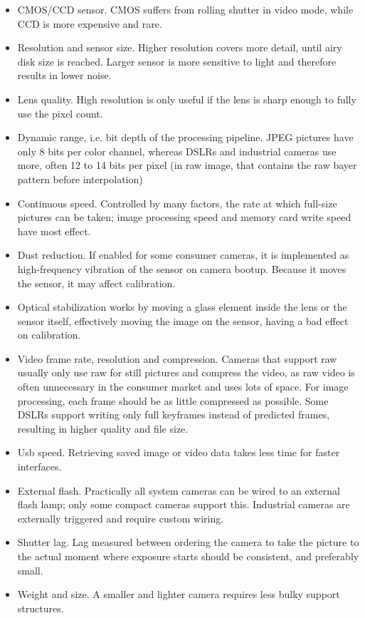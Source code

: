 \begin{itemize}
\item CMOS/CCD sensor. CMOS suffers from rolling shutter in video mode, while CCD is more expensive and rare.
\item Resolution and sensor size. Higher resolution covers more detail, until airy disk size is reached. Larger sensor is more sensitive to light and therefore results in lower noise.
\item Lens quality. High resolution is only useful if the lens is sharp enough to fully use the pixel count.
\item Dynamic range, i.e. bit depth of the processing pipeline. JPEG pictures have only 8 bits per color channel, whereas DSLRs and industrial cameras use more, often 12 to 14 bits per pixel (in raw image, that contains the raw bayer pattern before interpolation)
\item Continuous speed. Controlled by many factors, the rate at which full-size pictures can be taken; image processing speed and memory card write speed have most effect.
\item Dust reduction. If enabled for some consumer cameras, it is implemented as high-frequency vibration of the sensor on camera bootup. Because it moves the sensor, it may affect calibration.
\item Optical stabilization works by moving a glass element inside the lens or the sensor itself, effectively moving the image on the sensor, having a bad effect on calibration.
\item Video frame rate, resolution and compression. Cameras that support raw usually only use raw for still pictures and compress the video, as raw video is often unnecessary in the consumer market and uses lots of space. For image processing, each frame should be as little compressed as possible. Some DSLRs support writing only full keyframes instead of predicted frames, resulting in higher quality and file size.
\item Usb speed. Retrieving saved image or video data takes less time for faster interfaces.
\item External flash. Practically all system cameras can be wired to an external flash lamp; only some compact cameras support this. Industrial cameras are externally triggered and require custom wiring.
\item Shutter lag. Lag measured between ordering the camera to take the picture to the actual moment where exposure starts should be consistent, and preferably small.
\item Weight and size. A smaller and lighter camera requires less bulky support structures.

\end{itemize}
